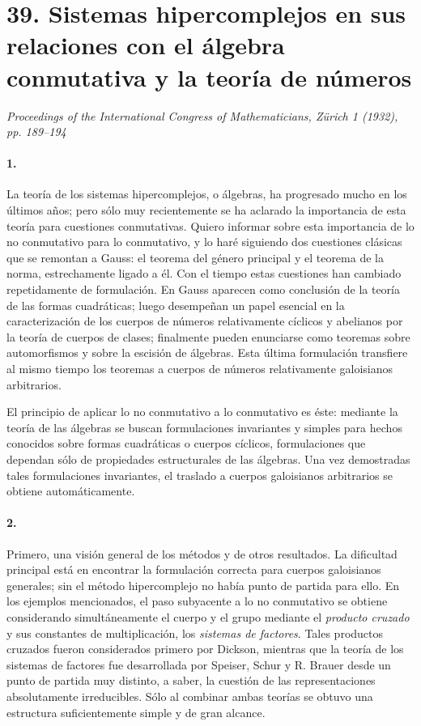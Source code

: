 \section*{39. Sistemas hipercomplejos en sus relaciones con el álgebra conmutativa y la teoría de números}

\begin{center}
\emph{Proceedings of the International Congress of Mathematicians, Zürich 1 (1932), pp. 189--194}
\end{center}

\paragraph{1.}
La teoría de los sistemas hipercomplejos, o álgebras, ha progresado mucho en los últimos años; pero sólo muy recientemente se ha aclarado la importancia de esta teoría para cuestiones conmutativas. Quiero informar sobre esta importancia de lo no conmutativo para lo conmutativo, y lo haré siguiendo dos cuestiones clásicas que se remontan a Gauss: el teorema del género principal y el teorema de la norma, estrechamente ligado a él. Con el tiempo estas cuestiones han cambiado repetidamente de formulación. En Gauss aparecen como conclusión de la teoría de las formas cuadráticas; luego desempeñan un papel esencial en la caracterización de los cuerpos de números relativamente cíclicos y abelianos por la teoría de cuerpos de clases; finalmente pueden enunciarse como teoremas sobre automorfismos y sobre la escisión de álgebras. Esta última formulación transfiere al mismo tiempo los teoremas a cuerpos de números relativamente galoisianos arbitrarios.

El principio de aplicar lo no conmutativo a lo conmutativo es éste: mediante la teoría de las álgebras se buscan formulaciones invariantes y simples para hechos conocidos sobre formas cuadráticas o cuerpos cíclicos, formulaciones que dependan sólo de propiedades estructurales de las álgebras. Una vez demostradas tales formulaciones invariantes, el traslado a cuerpos galoisianos arbitrarios se obtiene automáticamente.

\paragraph{2.}
Primero, una visión general de los métodos y de otros resultados. La dificultad principal está en encontrar la formulación correcta para cuerpos galoisianos generales; sin el método hipercomplejo no había punto de partida para ello. En los ejemplos mencionados, el paso subyacente a lo no conmutativo se obtiene considerando simultáneamente el cuerpo y el grupo mediante el \emph{producto cruzado} y sus constantes de multiplicación, los \emph{sistemas de factores}. Tales productos cruzados fueron considerados primero por Dickson, mientras que la teoría de los sistemas de factores fue desarrollada por Speiser, Schur y R. Brauer desde un punto de partida muy distinto, a saber, la cuestión de las representaciones absolutamente irreducibles. Sólo al combinar ambas teorías se obtuvo una estructura suficientemente simple y de gran alcance.

